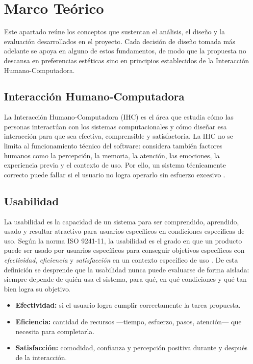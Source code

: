 \section{Marco Teórico}

Este apartado reúne los conceptos que sustentan el análisis, el diseño y la evaluación desarrollados en el proyecto. Cada decisión de diseño tomada más adelante se apoya en alguno de estos fundamentos, de modo que la propuesta no descansa en preferencias estéticas sino en principios establecidos de la Interacción Humano-Computadora.

\subsection{Interacción Humano-Computadora}

La Interacción Humano-Computadora (IHC) es el área que estudia cómo las personas interactúan con los sistemas computacionales y cómo diseñar esa interacción para que sea efectiva, comprensible y satisfactoria. La IHC no se limita al funcionamiento técnico del software: considera también factores humanos como la percepción, la memoria, la atención, las emociones, la experiencia previa y el contexto de uso. Por ello, un sistema técnicamente correcto puede fallar si el usuario no logra operarlo sin esfuerzo excesivo \autocite{norman2002}.

\subsection{Usabilidad}

La usabilidad es la capacidad de un sistema para ser comprendido, aprendido, usado y resultar atractivo para usuarios específicos en condiciones específicas de uso. Según la norma ISO 9241-11, la usabilidad es el grado en que un producto puede ser usado por usuarios específicos para conseguir objetivos específicos con \textit{efectividad}, \textit{eficiencia} y \textit{satisfacción} en un contexto específico de uso \autocite{iso9241}. De esta definición se desprende que la usabilidad nunca puede evaluarse de forma aislada: siempre depende de quién usa el sistema, para qué, en qué condiciones y qué tan bien logra su objetivo.

\begin{itemize}
  \item \textbf{Efectividad:} si el usuario logra cumplir correctamente la tarea propuesta.
  \item \textbf{Eficiencia:} cantidad de recursos —tiempo, esfuerzo, pasos, atención— que necesita para completarla.
  \item \textbf{Satisfacción:} comodidad, confianza y percepción positiva durante y después de la interacción.
\end{itemize}

